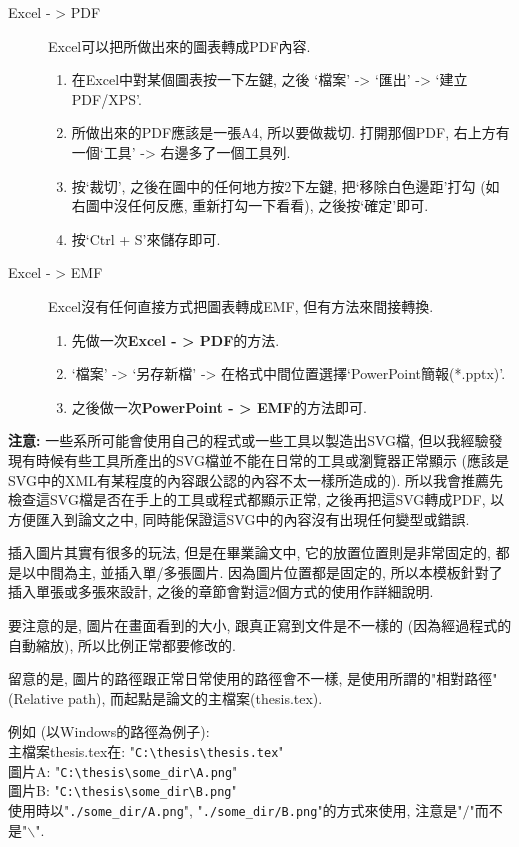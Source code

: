 \begin{description}
  \item[Excel - > PDF] Excel可以把所做出來的圖表轉成PDF內容.
    \begin{enumerate}
      \item 在Excel中對某個圖表按一下左鍵, 之後 `檔案' -> `匯出' -> `建立PDF/XPS'.
      \item 所做出來的PDF應該是一張A4, 所以要做裁切. 打開那個PDF, 右上方有一個`工具' -> 右邊多了一個工具列.
      \item 按`裁切', 之後在圖中的任何地方按2下左鍵, 把`移除白色邊距'打勾 (如右圖中沒任何反應, 重新打勾一下看看), 之後按`確定'即可.
      \item 按`Ctrl + S'來儲存即可.
    \end{enumerate}

  \item[Excel - > EMF] Excel沒有任何直接方式把圖表轉成EMF, 但有方法來間接轉換.
    \begin{enumerate}
      \item 先做一次\textbf{Excel - > PDF}的方法.
      \item `檔案' -> `另存新檔' -> 在格式中間位置選擇`PowerPoint簡報(*.pptx)'.
      \item 之後做一次\textbf{PowerPoint - > EMF}的方法即可.
    \end{enumerate}
\end{description}

\noindent \textbf{注意:} 一些系所可能會使用自己的程式或一些工具以製造出SVG檔, 但以我經驗發現有時候有些工具所產出的SVG檔並不能在日常的工具或瀏覽器正常顯示 (應該是SVG中的XML有某程度的內容跟公認的內容不太一樣所造成的). 所以我會推薦先檢查這SVG檔是否在手上的工具或程式都顯示正常, 之後再把這SVG轉成PDF, 以方便匯入到論文之中, 同時能保證這SVG中的內容沒有出現任何變型或錯誤.

\newpage
{}

插入圖片其實有很多的玩法, 但是在畢業論文中, 它的放置位置則是非常固定的, 都是以中間為主, 並插入單/多張圖片. 因為圖片位置都是固定的, 所以本模板針對了插入單張或多張來設計, 之後的章節會對這2個方式的使用作詳細說明.

要注意的是, 圖片在畫面看到的大小, 跟真正寫到文件是不一樣的 (因為經過程式的自動縮放), 所以比例正常都要修改的.

留意的是, 圖片的路徑跟正常日常使用的路徑會不一樣, 是使用所謂的"相對路徑" (Relative path), 而起點是論文的主檔案(thesis.tex).

\noindent 例如 (以Windows的路徑為例子):\\
主檔案thesis.tex在: "\verb|C:\thesis\thesis.tex|"\\
圖片A: "\verb|C:\thesis\some_dir\A.png|"\\
圖片B: "\verb|C:\thesis\some_dir\B.png|"\\
使用時以"\verb|./some_dir/A.png|", "\verb|./some_dir/B.png|"的方式來使用, 注意是"$/$"而不是"$\backslash$".


